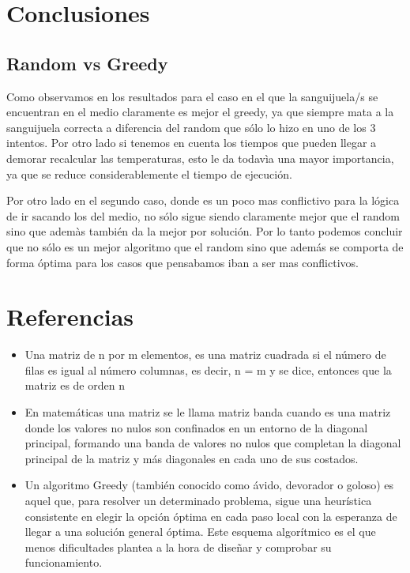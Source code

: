 \section{Conclusiones}

\subsection{Random vs Greedy}

Como observamos en los resultados para el caso en el que la sanguijuela/s se encuentran en el medio claramente es mejor el greedy, ya que siempre mata a la sanguijuela correcta a diferencia del random que sólo lo hizo en uno de los 3 intentos. Por otro lado si tenemos en cuenta los tiempos que pueden llegar a demorar recalcular las temperaturas, esto le da todavìa una mayor importancia, ya que se reduce considerablemente el tiempo de ejecución.

Por otro lado en el segundo caso, donde es un poco mas conflictivo para la lógica de ir sacando los del medio, no sólo sigue siendo claramente mejor que el random sino que ademàs también da la mejor por solución. Por lo tanto podemos concluir que no sólo es un mejor algoritmo que el random sino que además se comporta de forma óptima para los casos que pensabamos iban a ser mas conflictivos.

\newpage

\section{Referencias}\label{sec:MatrizCuadrada}

\begin{itemize}

\item Una matriz de n por m elementos, es una matriz cuadrada si el número de filas es igual al número columnas, es decir, n = m y se dice, entonces que la matriz es de orden n

\item En matemáticas una matriz se le llama matriz banda cuando es una matriz donde los valores no nulos son confinados en un entorno de la diagonal principal, formando una banda de valores no nulos que completan la diagonal principal de la matriz y más diagonales en cada uno de sus costados.

\item Un algoritmo Greedy (también conocido como ávido, devorador o goloso) es aquel que, para resolver un determinado problema, sigue una heurística consistente en elegir la opción óptima en cada paso local con la esperanza de llegar a una solución general óptima. Este esquema algorítmico es el que menos dificultades plantea a la hora de diseñar y comprobar su funcionamiento.

\end{itemize}






